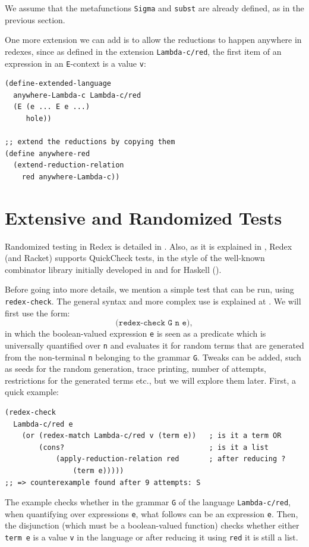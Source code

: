 We assume that the metafunctions \texttt{Sigma} and \texttt{subst} are already
defined, as in the previous section.

One more extension we can add is to allow the reductions to happen anywhere
in redexes, since as defined in the extension \texttt{Lambda-c/red}, the first
item of an expression in an \texttt{E}-context is a value \texttt{v}:
{
  \small
\begin{verbatim}
(define-extended-language
  anywhere-Lambda-c Lambda-c/red
  (E (e ... E e ...)
     hole))

;; extend the reductions by copying them
(define anywhere-red
  (extend-reduction-relation
    red anywhere-Lambda-c))
\end{verbatim}
}

\section{Extensive and Randomized Tests}

Randomized testing in Redex is detailed in \cite{randomplt}. Also, as it is
explained in \cite{popl}, Redex (and Racket) supports QuickCheck tests,
in the style of the well-known combinator library initially developed
in and for Haskell (\cite{quickcheck}).

Before going into more details, we mention a simple test that can be run,
using \texttt{redex-check}. The general syntax and more complex use is
explained at \cite{redex-check}. We will first use the form:
\[
  \texttt{(redex-check G n e)},
\]
in which the boolean-valued expression \texttt{e} is seen as a predicate
which is universally quantified over \texttt{n} and evaluates it for
random terms that are generated from the non-terminal \texttt{n} belonging
to the grammar \texttt{G}. Tweaks can be added, such as seeds for the
random generation, trace printing, number of attempts, restrictions for the
generated terms etc., but we will explore them later. First, a quick example:
{
  \small
\begin{verbatim}
(redex-check
  Lambda-c/red e
    (or (redex-match Lambda-c/red v (term e))   ; is it a term OR
        (cons?                                  ; is it a list
            (apply-reduction-relation red       ; after reducing ?
                (term e)))))
;; => counterexample found after 9 attempts: S
\end{verbatim}
}

The example checks whether in the grammar \texttt{G} of the language
\texttt{Lambda-c/red}, when quantifying over expressions \texttt{e},
what follows can be an expression \texttt{e}. Then, the disjunction
(which must be a boolean-valued function) checks whether either
\texttt{term e} is a value \texttt{v} in the language or after
reducing it using \texttt{red} it is still a list.

